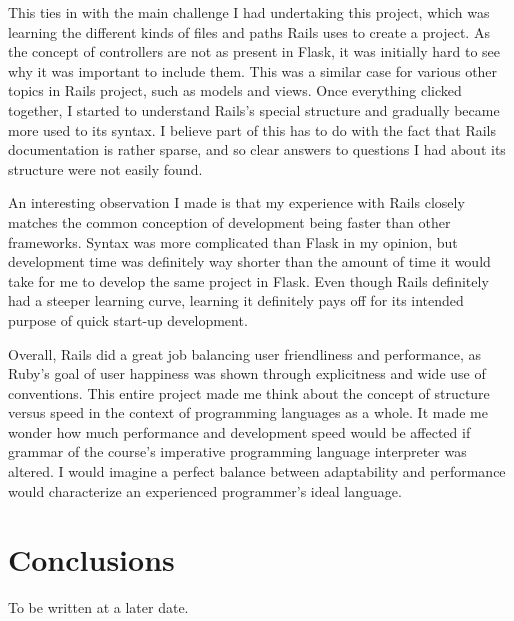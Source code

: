 \documentclass{article}
\theoremstyle{theorem}
\theoremstyle{definition}
\theoremstyle{remark}
\begin{document}
This ties in with the main challenge I had undertaking this project, which was learning the different kinds of files and paths Rails uses to create a project. As the concept of controllers are not as present in Flask, it was initially hard to see why it was important to include them. This was a similar case for various other topics in Rails project, such as models and views. Once everything clicked together, I started to understand Rails's special structure and gradually became more used to its syntax. I believe part of this has to do with the fact that Rails documentation is rather sparse, and so clear answers to questions I had about its structure were not easily found.

An interesting observation I made is that my experience with Rails closely matches the common conception of development being faster than other frameworks. Syntax was more complicated than Flask in my opinion, but development time was definitely way shorter than the amount of time it would take for me to develop the same project in Flask.
Even though Rails definitely had a steeper learning curve, learning it definitely pays off for its intended purpose of quick start-up development.

Overall, Rails did a great job balancing user friendliness and performance, as Ruby's goal of user happiness was shown through explicitness and wide use of conventions. This entire project made me think about the concept of structure versus speed in the context of programming languages as a whole. It made me wonder how much performance and development speed would be affected if grammar of the course's imperative programming language interpreter was altered. I would imagine a perfect balance between adaptability and performance would characterize an experienced programmer's ideal language.

\section{Conclusions}\label{conclusions}

To be written at a later date.
\end{document}
